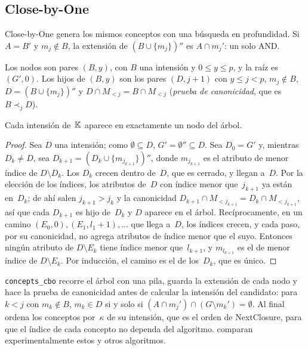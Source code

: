 \subsection{Close-by-One}
\label{sec:cbo}

Close-by-One \parencite{kuznetsov1993} genera los mismos conceptos con una búsqueda en profundidad. Si $A = B'$ y $m_j \notin B$, la extensión de $(B \cup \{m_j\})''$ es $A \cap m_j'$: un solo AND.

\begin{definicion}\label{def:cbo}
Los nodos son pares $(B, y)$, con $B$ una intensión y $0 \le y \le p$, y la raíz es $(G', 0)$. Los hijos de $(B, y)$ son los pares $(D, j + 1)$ con $y \le j < p$, $m_j \notin B$, $D = (B \cup \{m_j\})''$ y $D \cap M_{<j} = B \cap M_{<j}$ (\emph{prueba de canonicidad}, que es $B \prec_j D$).
\end{definicion}

\begin{teorema}\label{teo:cbo}
Cada intensión de~$\mathbb{K}$ aparece en exactamente un nodo del árbol.
\end{teorema}

\begin{proof}
Sea $D$ una intensión; como $\emptyset \subseteq D$, $G' = \emptyset'' \subseteq D$. Sea $D_0 = G'$ y, mientras $D_k \ne D$, sea $D_{k+1} = (D_k \cup \{m_{j_{k+1}}\})''$, donde $m_{j_{k+1}}$ es el atributo de menor índice de $D \setminus D_k$. Los $D_k$ crecen dentro de~$D$, que es cerrado, y llegan a~$D$. Por la elección de los índices, los atributos de~$D$ con índice menor que~$j_{k+1}$ ya están en~$D_k$; de ahí salen $j_{k+1} > j_k$ y la canonicidad $D_{k+1} \cap M_{<j_{k+1}} = D_k \cap M_{<j_{k+1}}$, así que cada $D_{k+1}$ es hijo de~$D_k$ y $D$ aparece en el árbol. Recíprocamente, en un camino $(E_0, 0), (E_1, l_1 + 1), \dots$ que llega a~$D$, los índices crecen, y cada paso, por su canonicidad, no agrega atributos de índice menor que el suyo. Entonces ningún atributo de $D \setminus E_k$ tiene índice menor que~$l_{k+1}$, y $m_{l_{k+1}}$ es el de menor índice de $D \setminus E_k$. Por inducción, el camino es el de los~$D_k$, que es único.
\end{proof}

\begin{observacion}[implementación]\label{obs:cbo-codigo}
\texttt{concepts\_cbo} recorre el árbol con una pila, guarda la extensión de cada nodo y hace la prueba de canonicidad antes de calcular la intensión del candidato: para $k < j$ con $m_k \notin B$, $m_k \in D$ si y solo si $(A \cap m_j') \cap (G \setminus m_k') = \emptyset$. Al final ordena los conceptos por~$\kappa$ de su intensión, que es el orden de NextClosure, para que el índice de cada concepto no dependa del algoritmo. \textcite{kuznetsov2002} comparan experimentalmente estos y otros algoritmos.
\end{observacion}


